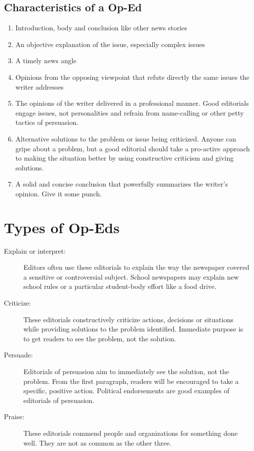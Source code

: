 \documentclass{tufte-handout}\usepackage[]{graphicx}\usepackage[]{color}
\begin{document}
\subsection{Characteristics of a Op-Ed}

\begin{enumerate}
	\item Introduction, body and conclusion like other news stories
	\item An objective explanation of the issue, especially complex issues
	\item A timely news angle
	\item Opinions from the opposing viewpoint that refute directly the same issues the writer addresses
	\item The opinions of the writer delivered in a professional manner. Good editorials engage issues, not personalities and refrain from name-calling or other petty tactics of persuasion.
	\item Alternative solutions to the problem or issue being criticized. Anyone can gripe about a problem, but a good editorial should take a pro-active approach to making the situation better by using constructive criticism and giving solutions.
	\item A solid and concise conclusion that powerfully summarizes the writer's opinion. Give it some punch.
\end{enumerate}

\section{Types of Op-Eds}

\begin{description}
	\item[Explain or interpret:] Editors often use these editorials to explain the way the newspaper covered a sensitive or controversial subject. School newspapers may explain new school rules or a particular student-body effort like a food drive.
	\item[Criticize:] These editorials constructively criticize actions, decisions or situations while providing solutions to the problem identified. Immediate purpose is to get readers to see the problem, not the solution.
	\item[Persuade:] Editorials of persuasion aim to immediately see the solution, not the problem. From the first paragraph, readers will be encouraged to take a specific, positive action. Political endorsements are good examples of editorials of persuasion.
	\item[Praise:] These editorials commend people and organizations for something done well. They are not as common as the other three.
\end{description}
 
\end{document}
